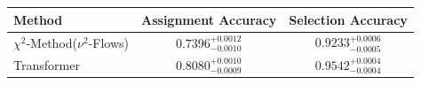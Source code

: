     \begin{tabular}{lcc}
        \toprule
        Method & Assignment Accuracy & Selection Accuracy \\
        \midrule
        $\chi^2$-Method($\nu^2$-Flows) & $0.7396_{-0.0010}^{+0.0012}$ & $0.9233_{-0.0005}^{+0.0006}$ \\
        Transformer & $0.8080_{-0.0009}^{+0.0010}$ & $0.9542_{-0.0004}^{+0.0004}$ \\
        \bottomrule
    \end{tabular}
